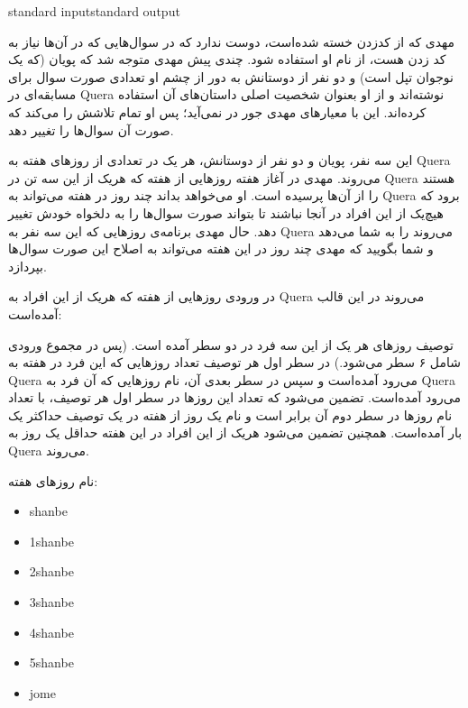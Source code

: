 \begin{problem}{}
{standard input}{standard output}
{}{}{}

    مهدی که از کدزدن خسته شده‌است، دوست ندارد که در سوال‌هایی که در آن‌ها نیاز به کد زدن هست، از نام او استفاده شود. چندی پیش مهدی متوجه شد که پویان (که یک نوجوان تپل است) و دو نفر از دوستانش به دور از چشم او تعدادی صورت سوال برای مسابقه‌ای در Quera نوشته‌اند و از او بعنوان شخصیت اصلی داستان‌های آن استفاده کرده‌اند. این با معیارهای مهدی جور در نمی‌آید؛ پس او تمام تلاشش را می‌کند که صورت آن سوال‌ها را تغییر دهد.

    این سه نفر، پویان و دو نفر از دوستانش، هر یک در تعدادی از روزهای هفته به Quera می‌روند. مهدی در آغاز هفته روزهایی از هفته که هریک از این سه تن در Quera هستند را از آن‌ها پرسیده است. او می‌خواهد بداند چند روز در هفته می‌تواند به Quera برود که هیچ‌یک از این افراد در آنجا نباشند تا بتواند صورت سوال‌ها را به دلخواه خودش تغییر دهد. حال مهدی برنامه‌ی روزهایی که این سه نفر به Quera می‌روند را به شما می‌دهد و شما بگویید که مهدی چند روز در این هفته می‌تواند به اصلاح این صورت سوال‌ها بپردازد.
    \Example

    \begin{examplethree}
    \end{examplethree}

    \Explanation

    در ورودی روز‌هایی از هفته که هریک از این افراد به Quera می‌روند در این قالب آمده‌است:

    توصیف روز‌های هر یک از این سه فرد در دو سطر آمده است. (پس در مجموع ورودی شامل ۶ سطر می‌شود.) در سطر اول هر توصیف تعداد روز‌هایی که این فرد در هفته به Quera می‌رود آمده‌است و سپس در سطر بعدی آن، نام روز‌هایی که آن فرد به Quera می‌رود آمده‌است. تضمین می‌شود که تعداد این روز‌ها در سطر اول هر توصیف، با تعداد نام روزها در سطر دوم آن برابر است و نام یک روز از هفته در یک توصیف حداکثر یک‌ بار آمده‌است. همچنین تضمین می‌شود هریک از این افراد در این هفته حداقل یک روز به Quera می‌روند.

    نام روز‌های هفته:
\begin{itemize}
    \item shanbe
    \item 1shanbe
    \item 2shanbe
    \item 3shanbe
    \item 4shanbe
    \item 5shanbe
    \item jome
\end{itemize}

\end{problem}
